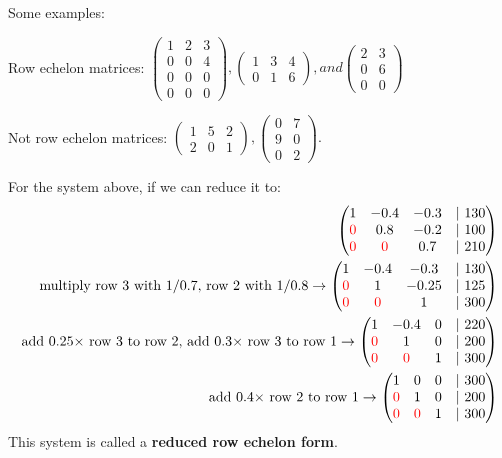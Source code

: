 \documentclass[10pt,a4paper]{book}
\newcommand{\red}[1]{\textcolor{red}{#1}}
\theoremstyle{definition}\newtheorem{definition}{Definition}
\theoremstyle{definition}\newtheorem{fact}{Fact}
\theoremstyle{definition}\newtheorem{ex}{Ex.}
\theoremstyle{definition}\newtheorem{project}{Project}
\theoremstyle{definition}\newtheorem{problem}{Problem}
\theoremstyle{definition}\newtheorem{example}{Example}
\numberwithin{theorem}{chapter}
\numberwithin{corollary}{chapter}
\numberwithin{assumption}{chapter}
\numberwithin{definition}{chapter}
\numberwithin{prop}{chapter}
\numberwithin{notation}{chapter}
\numberwithin{problem}{chapter}
\numberwithin{example}{chapter}
\numberwithin{fact}{chapter}
\numberwithin{ex}{chapter}
\begin{document}
	Some examples:
	
	Row echelon matrices:
	$\begin{pmatrix}
		1 & 2 & 3 \\
		0 & 0 & 4 \\
		0 & 0 & 0 \\
		0 & 0 & 0 
	\end{pmatrix},
	\begin{pmatrix}
		1 & 3 & 4 \\
		0 & 1 & 6 
	\end{pmatrix},
	and \begin{pmatrix}
		2 & 3 \\
		0 & 6 \\
		0 & 0
	\end{pmatrix}$
	
	Not row echelon matrices:
	$\begin{pmatrix}
		1 & 5 & 2 \\
		2 & 0 & 1 
	\end{pmatrix},
	\begin{pmatrix}
		0 & 7 \\
		9 & 0 \\
		0 & 2 
	\end{pmatrix}.$
	
	For the system above, if we can reduce it to:
	\begin{align*}
		\begin{pmatrix}
			1       & -0.4    & -0.3  & | \ 130  \\
			\red{0} & 0.8     & -0.2  & | \  100 \\
			\red{0} & \red{0} & 0.7   & | \ 210  \\
		\end{pmatrix} \\
		\text{multiply row 3 with $1/0.7$, row 2 with $1/0.8$} \rightarrow 
		\begin{pmatrix}
			1       & -0.4    & -0.3  & | \ 130  \\
			\red{0} & 1       & -0.25 & | \  125 \\
			\red{0} & \red{0} & 1     & | \ 300  \\
		\end{pmatrix} \\
		\text{add $0.25\times$ row 3 to row 2, add $0.3\times$ row 3 to row 1} \rightarrow 
		\begin{pmatrix}
			1       & -0.4    & 0     & | \ 220  \\
			\red{0} & 1       & 0     & | \  200 \\
			\red{0} & \red{0} & 1     & | \ 300  \\
		\end{pmatrix} \\
		\text{add $0.4\times$ row 2 to row 1} \rightarrow 
		\begin{pmatrix}
			1       & 0       & 0     & | \ 300  \\
			\red{0} & 1       & 0     & | \  200 \\
			\red{0} & \red{0} & 1     & | \ 300  \\
		\end{pmatrix}
	\end{align*}
	This system is called a \textbf{reduced row echelon form}.
	
\end{document}
